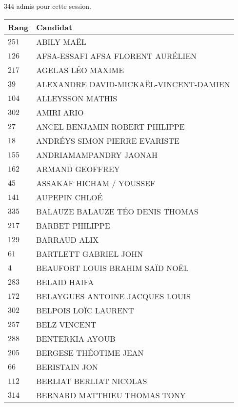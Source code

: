 



  $344$ admis pour cette session.

  \begin{xltabular}{\linewidth}{|l|X|}
    \hline
    \textbf{Rang} & \textbf{Candidat} \\
    \hline
    $251$ & ABILY MAËL \\
    \hline
    $126$ & AFSA-ESSAFI AFSA FLORENT AURÉLIEN \\
    \hline
    $217$ & AGELAS LÉO MAXIME \\
    \hline
    $39$ & ALEXANDRE DAVID-MICKAËL-VINCENT-DAMIEN \\
    \hline
    $104$ & ALLEYSSON MATHIS \\
    \hline
    $302$ & AMIRI ARIO \\
    \hline
    $27$ & ANCEL BENJAMIN ROBERT PHILIPPE \\
    \hline
    $18$ & ANDRÉYS SIMON PIERRE EVARISTE \\
    \hline
    $155$ & ANDRIAMAMPANDRY JAONAH \\
    \hline
    $162$ & ARMAND GEOFFREY \\
    \hline
    $45$ & ASSAKAF HICHAM / YOUSSEF \\
    \hline
    $141$ & AUPEPIN CHLOÉ \\
    \hline
    $335$ & BALAUZE BALAUZE TÉO DENIS THOMAS \\
    \hline
    $217$ & BARBET PHILIPPE \\
    \hline
    $129$ & BARRAUD ALIX \\
    \hline
    $61$ & BARTLETT GABRIEL JOHN \\
    \hline
    $4$ & BEAUFORT LOUIS BRAHIM SAÏD NOËL \\
    \hline
    $283$ & BELAID HAIFA \\
    \hline
    $172$ & BELAYGUES ANTOINE JACQUES LOUIS \\
    \hline
    $302$ & BELPOIS LOÏC LAURENT \\
    \hline
    $257$ & BELZ VINCENT \\
    \hline
    $288$ & BENTERKIA AYOUB \\
    \hline
    $205$ & BERGESE THÉOTIME JEAN \\
    \hline
    $66$ & BERISTAIN JON \\
    \hline
    $112$ & BERLIAT BERLIAT NICOLAS \\
    \hline
    $314$ & BERNARD MATTHIEU THOMAS TONY \\

\end{xltabular}
